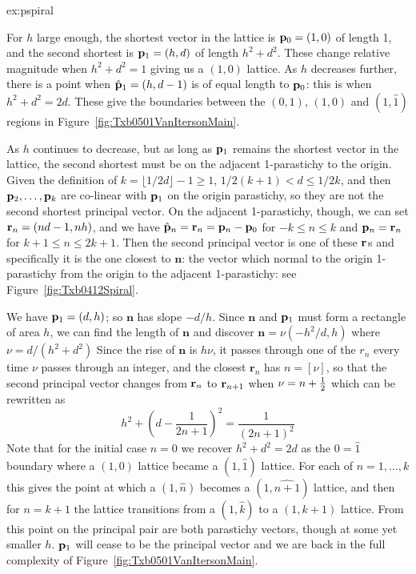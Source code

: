 \begin{jAnswer}{ex:pspiral}{
For $h$ large enough, 	the shortest vector in the lattice is  ${\mathbf p}_{0}=(1,0)$ 
of length 1, and the second shortest is  ${\mathbf p}_{1}=(h,d)$ of length $h^2+d^2$.
These change relative magnitude when $h^2+d^2=1$ giving us a $(1,0)$ lattice.
As $h$ decreases further, there is a point when  $\hat{\mathbf p}_{1}=(h,d-1)$ is of equal length to ${\mathbf p}_{0}$: this is when $h^2+d^2=2d$. These give the boundaries between the $(0,1)$, $(1,0)$ and $(1,\hat 1)$ regions in Figure~\ref{fig:Txb0501VanItersonMain}. 

As $h$ continues to decrease, but as long as ${\mathbf p}_{1}$ remains the shortest vector in the lattice, the second shortest
must be on the adjacent 1-parastichy to the origin. Given the definition of $k=\lfloor1/2d\rfloor-1\geq 1$, $1/2(k+1)<d\leq 1/2k$,  and then ${\mathbf p}_{2},\ldots,{\mathbf p}_{k}$ are co-linear with ${\mathbf p}_{1}$ on the origin parastichy, so they are not the second shortest principal vector. On the adjacent 1-parastichy, though, we can set $\mathbf{r}_{n}=  (nd-1,n h)$, and we have $\hat{\mathbf p}_{n}=\mathbf{r}_{n}={\mathbf p}_{n}-{\mathbf p}_{0}$ for $-k\leq n\leq k$ and ${\mathbf p}_{n}=\mathbf{r}_{n}$ for $k+1\leq n\leq 2k+1$. Then the second principal vector is one of these $\mathbf{r}_{}$s and specifically it is the one closest to $\mathbf{n}$: the vector which normal to the origin 1-parastichy from the origin to the adjacent 1-parastichy: see Figure~\ref{fig:Txb0412Spiral}.
%

We have ${\mathbf p}_{1}=(d,h)$; so $\mathbf{n}$  has slope $-d/h$. Since   $\mathbf{n}$ and ${\mathbf p}_{1}$
must form a rectangle of area $h$, we can find the length of  $\mathbf{n}$ and discover  $\mathbf{n} = \nu (-h^2 /d,h)$
where 
$
	\nu = 
	{d}/{(h^2+d^2)}
$
Since the rise of $\mathbf{n}$ is $h\nu$, it passes through one of the $r_n$ every time $\nu$ passes through an integer,
and the closest  $\mathbf{r}_n$ has $n=[\nu]$, so that the second principal vector changes from $\mathbf{r}_{n}$ to 
$\mathbf{r}_{n+1}$  when $\nu=n+\textstyle{\frac{1}{2}}$ which can be rewritten as 
\begin{equation}
{h^2+\left(d-\frac{1}{2n+1}\right)^2}=  \frac{1}{(2n+1)^2}
\end{equation}
Note that for the initial case $n=0$ we recover $h^2+d^2=2d$ as the $0=\hat{1}$ boundary where a $(1,0)$ lattice became a $(1,\hat 1)$ lattice. For each of $n=1,\ldots,k$ this gives the point at which a  $(1,\hat n)$ becomes a  $(1,\widehat {n+1})$ lattice, and then for $n=k+1$ the lattice transitions from a  $(1,\hat {k})$ to a $(1, {k+1})$ lattice.  From this point on the principal pair are both parastichy vectors, though at some yet smaller $h$.  ${\mathbf p}_{1}$ will cease to be the principal vector and we are back in the full complexity of Figure~\ref{fig:Txb0501VanItersonMain}.

}
\end{jAnswer}
